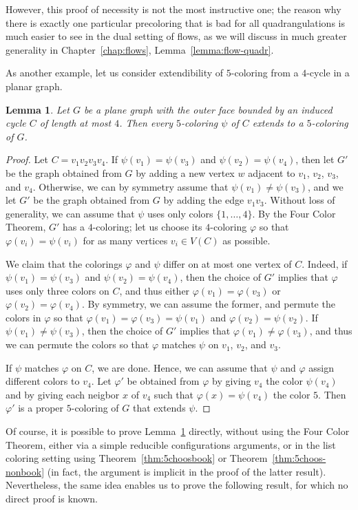 \documentclass[12pt,twoside,openright,a4paper]{book}
\newtheorem{lemma}[theorem]{Lemma}
\begin{document}
However, this proof of necessity is not the most instructive one; the reason why there is exactly one particular
precoloring that is bad for all quadrangulations is much easier to see in the dual setting of flows, as we will
discuss in much greater generality in Chapter~\ref{chap:flows}, Lemma~\ref{lemma:flow-quadr}.

As another example, let us consider extendibility of $5$-coloring from a $4$-cycle in a planar graph.
\begin{lemma}\label{lemma:extend54}
Let $G$ be a plane graph with the outer face bounded by an induced cycle $C$ of length at most $4$.
Then every $5$-coloring $\psi$ of $C$ extends to a $5$-coloring of $G$.
\end{lemma}
\begin{proof}
Let $C=v_1v_2v_3v_4$.  If $\psi(v_1)=\psi(v_3)$ and $\psi(v_2)=\psi(v_4)$, then let $G'$ be the graph
obtained from $G$ by adding a new vertex $w$ adjacent to $v_1$, $v_2$, $v_3$, and $v_4$.  Otherwise,
we can by symmetry assume that $\psi(v_1)\neq\psi(v_3)$, and we let $G'$ be the graph obtained from $G$
by adding the edge $v_1v_3$.  Without loss of generality, we can assume that $\psi$ uses only colors
$\{1,\ldots,4\}$.  By the Four Color Theorem, $G'$ has a $4$-coloring; let us choose its $4$-coloring $\varphi$
so that $\varphi(v_i)=\psi(v_i)$ for as many vertices $v_i\in V(C)$ as possible.

We claim that the colorings $\varphi$ and $\psi$ differ on at most one vertex of $C$.  Indeed, if $\psi(v_1)=\psi(v_3)$ and $\psi(v_2)=\psi(v_4)$,
then the choice of $G'$ implies that $\varphi$ uses only three colors on $C$, and thus either $\varphi(v_1)=\varphi(v_3)$ or $\varphi(v_2)=\varphi(v_4)$.
By symmetry, we can assume the former, and permute the colors in $\varphi$ so that $\varphi(v_1)=\varphi(v_3)=\psi(v_1)$ and $\varphi(v_2)=\psi(v_2)$.
If $\psi(v_1)\neq\psi(v_3)$, then the choice of $G'$ implies that $\varphi(v_1)\neq \varphi(v_3)$, and thus we can permute the colors so that $\varphi$
matches $\psi$ on $v_1$, $v_2$, and $v_3$.

If $\psi$ matches $\varphi$ on $C$, we are done.  Hence, we can assume that $\psi$ and $\varphi$ assign different colors to $v_4$.  Let $\varphi'$ be
obtained from $\varphi$ by giving $v_4$ the color $\psi(v_4)$ and by giving each neigbor $x$ of $v_4$ such that $\varphi(x)=\psi(v_4)$ the color $5$.
Then $\varphi'$ is a proper $5$-coloring of $G$ that extends $\psi$.
\end{proof}
Of course, it is possible to prove Lemma~\ref{lemma:extend54} directly, without using the Four Color Theorem, either via a simple reducible configurations arguments,
or in the list coloring setting using Theorem~\ref{thm:5choosbook} or Theorem~\ref{thm:5choos-nonbook} (in fact, the argument is implicit in the proof of the
latter result).  Nevertheless, the same idea enables us to prove the following result, for which no direct proof is known.
\end{document}
